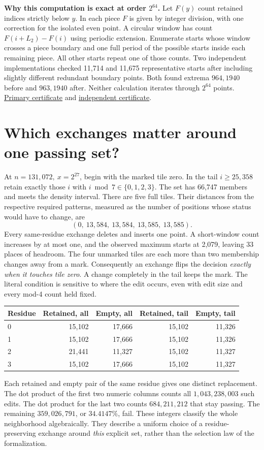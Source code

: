 \documentclass[11pt,letterpaper]{article}
\newcommand{\loc}[2]{\href{run:evidence/#1}{#2}}
\newcommand{\pp}[1]{\par\medskip\noindent\textbf{#1}\enspace}
\newcommand{\nextsection}[1]{\clearpage\section{#1}}
\begin{document}
\pp{Why this computation is exact at order \(2^{64}\).} Let \(F(y)\) count retained indices strictly below \(y\). In each piece \(F\) is given by integer division, with one correction for the isolated even point. A circular window has count \(F(i+L_2)-F(i)\) using periodic extension. Enumerate starts whose window crosses a piece boundary and one full period of the possible starts inside each remaining piece. All other starts repeat one of those counts. Two independent implementations checked 11,714 and 11,675 representative starts after including slightly different redundant boundary points. Both found extrema \(964,1940\) before and \(963,1940\) after. Neither calculation iterates through \(2^{64}\) points. \loc{index_two.py}{Primary certificate} and \loc{index_two_certificate.py}{independent certificate}.

\nextsection{Which exchanges matter around one passing set?}
At \(n=131{,}072,\ x=2^{27}\), begin with the marked tile zero. In the tail \(i\ge25{,}358\) retain exactly those \(i\) with \(i\bmod7\in\{0,1,2,3\}\). The set has 66,747 members and meets the density interval. There are five full tiles. Their distances from the respective required patterns, measured as the number of positions whose status would have to change, are
\[
       (0,\ 13{,}584,\ 13{,}584,\ 13{,}585,\ 13{,}585).
\]
Every same-residue exchange deletes and inserts one point. A short-window count increases by at most one, and the observed maximum starts at 2,079, leaving 33 places of headroom. The four unmarked tiles are each more than two membership changes away from a mark. Consequently an exchange flips the decision \emph{exactly when it touches tile zero}. A change completely in the tail keeps the mark. The literal condition is sensitive to where the edit occurs, even with edit size and every mod-4 count held fixed.

\begin{center}\small
\begin{tabular}{@{}lrrrr@{}}\toprule
Residue & Retained, all & Empty, all & Retained, tail & Empty, tail\\\midrule
0 & 15,102 & 17,666 & 15,102 & 11,326\\
1 & 15,102 & 17,666 & 15,102 & 11,326\\
2 & 21,441 & 11,327 & 15,102 & 11,327\\
3 & 15,102 & 17,666 & 15,102 & 11,327\\\bottomrule
\end{tabular}
\end{center}
Each retained and empty pair of the same residue gives one distinct replacement. The dot product of the first two numeric columns counts all \(1{,}043{,}238{,}003\) such edits. The dot product for the last two counts \(684{,}211{,}212\) that stay passing. The remaining \(359{,}026{,}791\), or \(34.4147\%\), fail. These integers classify the whole neighborhood algebraically. They describe a uniform choice of a residue-preserving exchange around \emph{this} explicit set, rather than the selection law of the formalization.
\end{document}
